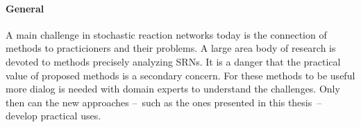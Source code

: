 \paragraph{General}
A main challenge in stochastic reaction networks today is the connection of methods to practicioners and their problems.
A large area body of research is devoted to methods precisely analyzing \acp{SRN}.
It is a danger that the practical value of proposed methods is a secondary concern.
For these methods to be useful more dialog is needed with domain experts to understand the challenges.
Only then can the new approaches --~such as the ones presented in this thesis~-- develop practical uses.
